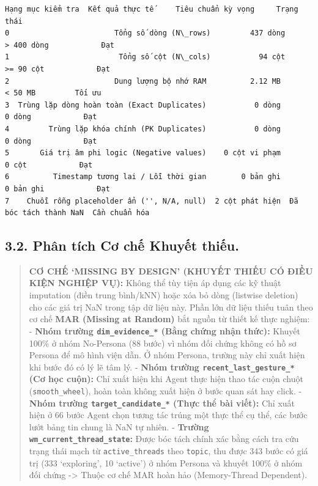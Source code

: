 \documentclass[11pt]{article}
\begin{document}
    
    \begin{Verbatim}[commandchars=\\\{\}]
                             Hạng mục kiểm tra  Kết quả thực tế     Tiêu chuẩn kỳ vọng     Trạng thái
0                        Tổng số dòng (N\_rows)         437 dòng             > 400 dòng            Đạt
1                         Tổng số cột (N\_cols)           94 cột              >= 90 cột            Đạt
2                        Dung lượng bộ nhớ RAM          2.12 MB                < 50 MB         Tối ưu
3  Trùng lặp dòng hoàn toàn (Exact Duplicates)           0 dòng                 0 dòng            Đạt
4         Trùng lặp khóa chính (PK Duplicates)           0 dòng                 0 dòng            Đạt
5       Giá trị âm phi logic (Negative values)    0 cột vi phạm                  0 cột            Đạt
6          Timestamp tương lai / Lỗi thời gian        0 bản ghi              0 bản ghi            Đạt
7    Chuỗi rỗng placeholder ẩn ('', N/A, null)  2 cột phát hiện  Đã bóc tách thành NaN  Cần chuẩn hóa
    \end{Verbatim}

    
    \subsection{3.2. Phân tích Cơ chế Khuyết
thiếu.}\label{phuxe2n-tuxedch-cux1a1-chux1ebf-khuyux1ebft-thiux1ebfu.}

\begin{quote}
\textbf{CƠ CHẾ `MISSING BY DESIGN' (KHUYẾT THIẾU CÓ ĐIỀU KIỆN NGHIỆP
VỤ):} Không thể tùy tiện áp dụng các kỹ thuật imputation (điền trung
bình/kNN) hoặc xóa bỏ dòng (listwise deletion) cho các giá trị NaN trong
tập dữ liệu này. Phần lớn dữ liệu thiếu tuân theo cơ chế \textbf{MAR
(Missing at Random)} bắt nguồn từ thiết kế thực nghiệm: - \textbf{Nhóm
trường \texttt{dim\_evidence\_*} (Bằng chứng nhận thức):} Khuyết 100\% ở
nhóm No-Persona (88 bước) vì nhóm đối chứng không có hồ sơ Persona để mô
hình viện dẫn. Ở nhóm Persona, trường này chỉ xuất hiện khi bước đó có
lý lẽ tâm lý. - \textbf{Nhóm trường \texttt{recent\_last\_gesture\_*}
(Cơ học cuộn):} Chỉ xuất hiện khi Agent thực hiện thao tác cuộn chuột
(\texttt{smooth\_wheel}), hoàn toàn không xuất hiện ở bước quan sát hay
click. - \textbf{Nhóm trường \texttt{target\_candidate\_*} (Thực thể bài
viết):} Chỉ xuất hiện ở 66 bước Agent chọn tương tác trúng một thực thể
cụ thể, các bước lướt bảng tin chung là NaN tự nhiên. - \textbf{Trường
\texttt{wm\_current\_thread\_state}:} Được bóc tách chính xác bằng cách
tra cứu trạng thái mạch từ \texttt{active\_threads} theo \texttt{topic},
thu được 343 bước có giá trị (333 `exploring', 10 `active') ở nhóm
Persona và khuyết 100\% ở nhóm đối chứng -\textgreater{} Thuộc cơ chế
MAR hoàn hảo (Memory-Thread Dependent).
\end{quote}
\end{document}

